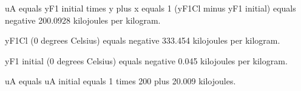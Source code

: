uA equals yF1 initial times y plus x equals 1 (yF1Cl minus yF1 initial) equals negative 200.0928 kilojoules per kilogram.

yF1Cl (0 degrees Celsius) equals negative 333.454 kilojoules per kilogram.

yF1 initial (0 degrees Celsius) equals negative 0.045 kilojoules per kilogram.

uA equals uA initial equals 1 times 200 plus 20.009 kilojoules.